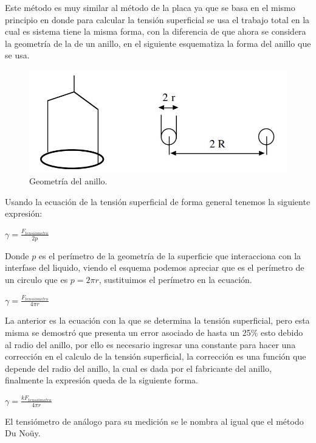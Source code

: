 \documentclass[10pt]{report}
\newcommand{\ec}[1]{\begin{center} $#1$ \end{center}}
\begin{document}
    Este método es muy similar al método de la placa ya que se basa en el mismo principio en donde para calcular la tensión superficial se usa el trabajo total en la cual es sistema tiene la misma forma, con la diferencia de que ahora se considera la geometría de la de un anillo, en el siguiente esquematiza la forma del anillo que se usa.

    \begin{figure}[h]
        \centering
        \includegraphics[scale=0.5]{./geometriaAnillo.jpg}
        \caption{Geometría del anillo.}
    \end{figure}

    Usando la ecuación de la tensión superficial de forma general tenemos la siguiente expresión: 

    \ec{\gamma = \frac{F_{tensiómetro}}{2p}}

    Donde $p$ es el perímetro de la geometría de la superficie que interacciona con la interfase del liquido, viendo el esquema podemos apreciar que es el perímetro de un circulo que es $p=2\pi r$, sustituimos el perímetro en la ecuación.

    \ec{\gamma = \frac{F_{tensiómetro}}{4\pi r}}

    La anterior es la ecuación con la que se determina la tensión superficial, pero esta misma se demostró que presenta un error asociado de hasta un 25\% esto debido al radio del anillo, por ello es necesario ingresar una constante para hacer una corrección en el calculo de la tensión superficial, la corrección es una función que depende del radio del anillo, la cual es dada por el fabricante del anillo, finalmente la expresión queda de la siguiente forma. 

    \ec{\gamma = \frac{kF_{tensiómetro}}{4\pi r}}

    El tensiómetro de análogo para su medición se le nombra al igual que el método Du Noüy. 
\end{document}
